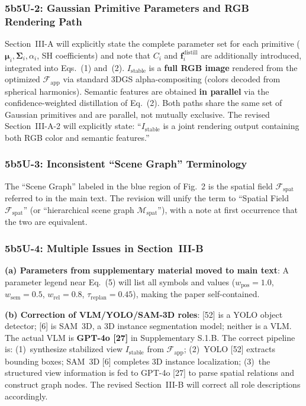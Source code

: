 \documentclass[10pt,a4paper]{article}
\begin{document}
\subsubsection*{5b5U-2: Gaussian Primitive Parameters and RGB Rendering Path}

Section~III-A will explicitly state the complete parameter set for each primitive ($\boldsymbol{\mu}_i,\boldsymbol{\Sigma}_i,\alpha_i$, SH coefficients) and note that $C_i$ and $\mathbf{f}_i^{\text{distill}}$ are additionally introduced, integrated into Eqs.~(1) and~(2). $I_{\text{stable}}$ is a \textbf{full RGB image} rendered from the optimized $\mathcal{F}_{\text{app}}$ via standard 3DGS alpha-compositing (colors decoded from spherical harmonics). Semantic features are obtained \textbf{in parallel} via the confidence-weighted distillation of Eq.~(2). Both paths share the same set of Gaussian primitives and are parallel, not mutually exclusive. The revised Section~III-A-2 will explicitly state: ``$I_{\text{stable}}$ is a joint rendering output containing both RGB color and semantic features.''

\subsubsection*{5b5U-3: Inconsistent ``Scene Graph'' Terminology}

The ``Scene Graph'' labeled in the blue region of Fig.~2 is the spatial field $\mathcal{F}_{\text{spat}}$ referred to in the main text. The revision will unify the term to ``Spatial Field $\mathcal{F}_{\text{spat}}$'' (or ``hierarchical scene graph $\mathcal{M}_{\text{spat}}$''), with a note at first occurrence that the two are equivalent.

\subsubsection*{5b5U-4: Multiple Issues in Section~III-B}

\textbf{(a) Parameters from supplementary material moved to main text}: A parameter legend near Eq.~(5) will list all symbols and values ($w_{\text{pos}}=1.0$, $w_{\text{sem}}=0.5$, $w_{\text{rel}}=0.8$, $\tau_{\text{replan}}=0.45$), making the paper self-contained.

\textbf{(b) Correction of VLM/YOLO/SAM-3D roles}: [52] is a YOLO object detector; [6] is SAM~3D, a 3D instance segmentation model; neither is a VLM. The actual VLM is \textbf{GPT-4o [27]} in Supplementary S.1.B. The correct pipeline is: (1)~synthesize stabilized view $I_{\text{stable}}$ from $\mathcal{F}_{\text{app}}$; (2)~YOLO [52] extracts bounding boxes; SAM~3D [6] completes 3D instance localization; (3)~the structured view information is fed to GPT-4o [27] to parse spatial relations and construct graph nodes. The revised Section~III-B will correct all role descriptions accordingly.
\end{document}
